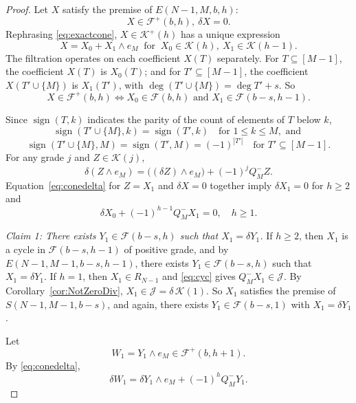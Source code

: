 \documentclass[12pt]{amsart}
\theoremstyle{definition}
\theoremstyle{remark}
\newcommand{\sgn}{\operatorname{sign}}
\newcommand{\cJ}{\mathcal J}
\newcommand{\K}{\mathcal K}
\newcommand{\FF}{\mathcal F}
\newcommand{\LL}{\mathcal K} %
\begin{document}
\begin{proof}

\smallskip
Let $X$ satisfy the premise of $E(N-1, M, b, h)$:
\[
X \in \FF^+(b, h), \ \delta X = 0.
\]
Rephrasing \eqref{eq:exactcone}, 
  $X \in \LL^+(h)$ has a unique expression
  \begin{equation}\label{eq:conesplit}
  X = X_0 + X_1\wedge e_M \ \text{ for } \
  X_0 \in \LL(h), \
  X_1 \in \LL(h-1). 
  \end{equation}
The filtration operates on each coefficient $X(T)$ separately.  For
$T\subseteq[M-1]$, the coefficient $X(T)$ is $X_0(T)$; and for $T'\subseteq[M-1]$,
the coefficient $X(T'\cup\{M\})$ is $X_1(T')$, with $\deg(T'\cup\{M\})=\deg T'+s$.  So
\begin{equation}\label{eq:eMpart}
 X\in \FF^+(b, h) \iff X_0\in \FF(b,h) \text{ and } X_1\in \FF({b-s},{h-1}).
\end{equation}

\smallskip
 Since $\sgn(T,k)$ indicates the parity of the count of elements of $T$ below $k$, 
 \[
  \sgn(T'\cup\{ M\},k)  =\sgn(T',k) \quad   \text{for } 1 \le k\le M, \text{ and }
  \]
\[
  \sgn(T'\cup\{M\}, M) =\sgn(T',M) =(-1)^{|T'|} \quad \text{for } T' \subseteq [M-1]. \]
For any grade $j$ and $Z \in \LL(j)$,
\begin{equation}\label{eq:conedelta}
\delta(Z\wedge e_{M})= \bigl( (\delta Z)\wedge e_{M}\bigr) +(-1)^j Q^-_M Z.
\end{equation}
Equation~\eqref{eq:conedelta} for $Z = X_1$ and $\delta X=0$ together imply
$\delta X_1 = 0$ for $h \geq 2$ and
\begin{equation}\label{eq:cyc}
\delta X_0+(-1)^{h-1}Q^-_M X_1=0, \quad h \geq 1.
\end{equation}

\smallskip
\emph{Claim 1: There exists $Y_1 \in \FF({b-s}, h)$
such that $X_1 = \delta Y_1$.}
If $h\ge2$, then $X_1$ is a cycle in $\FF(b-s, h-1)$ of positive grade, and
by $E(N-1,M-1,b-s,h-1)$, there exists $Y_1\in\FF(b-s,h)$ such that
$X_1=\delta Y_1$.  If $h=1$, then $X_1\in R_{N-1}$ and \eqref{eq:cyc}
gives $Q^-_MX_1\in\cJ$.  By Corollary~\ref{cor:NotZeroDiv},
$X_1\in\cJ=\delta\,\LL(1)$.  So $X_1$ satisfies the premise of
$S(N-1,M-1,b-s)$, and again, there exists $Y_1\in\FF(b-s,1)$ with
$X_1=\delta Y_1$.

Let \[
W_1 = Y_1 \wedge e_{M} \in \FF^+(b, h+1). \]
By \eqref{eq:conedelta},
\begin{equation}\label{eq:deltaW1}
\delta W_1 = \delta Y_1 \wedge e_{M} + (-1)^{h}Q^-_M Y_1.
\end{equation}


\end{proof}
\end{document}

